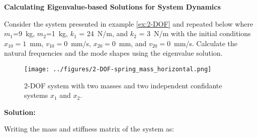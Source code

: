 \documentclass[12pt,letter]{article}
\begin{document}
	

	
	
	\pagebreak
	\begin{example}

	\noindent \textbf{Calculating Eigenvalue-based Solutions for System Dynamics}  

	\noindent Consider the system presented in example \ref{ex:2-DOF} and repeated below where $m_1$=9~kg, $m_2$=1~kg, $k_1$ = 24~N/m, and $k_2$ = 3~N/m with the initial conditions $x_{10}=1$~mm, $v_{10}=0$~mm/s, $x_{20}=0$~mm, and $v_{20}=0$~mm/s. Calculate the natural frequencies and the mode shapes using the eigenvalue solution. 
	\begin{figure}[H]
		\centering
		\texttt{[image: ../figures/2-DOF-spring\_mass\_horizontal.png]}
		\caption{2-DOF system with two masses and two independent confidante systems $x_1$ and $x_2$.}
	\end{figure}
	
	
	
	
\noindent \textbf{Solution:}  

\noindent Writing the mass and stiffness matrix of the system as:
	

\end{example}
\end{document}
